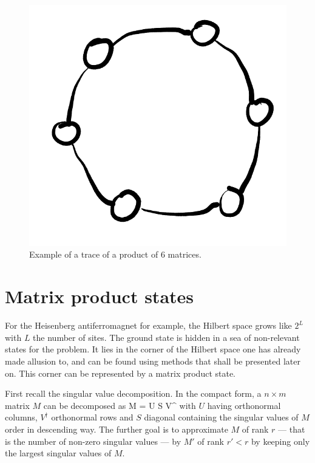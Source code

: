 		\begin{figure}[h!]
            \centering
            \includegraphics[scale=0.2]{graphs/TNtrace.png}
            \caption{Example of a trace of a product of $6$ matrices.}
            \label{fig:TNtrace}
        \end{figure}

    \section{Matrix product states}

    	For the Heisenberg antiferromagnet for example, the Hilbert space grows like $2^L$ with $L$ the number of sites. The ground state is hidden in a sea of non-relevant states for the problem. It lies in the corner of the Hilbert space one has already made allusion to, and can be found using methods that shall be presented later on. This corner can be represented by a matrix product state.

    	First recall the singular value decomposition. In the compact form, a $n\times m$ matrix $M$ can be decomposed as
    	\be M = U S V^\dagger \ee
    	with $U$ having orthonormal columns, $V^\dagger$ orthonormal rows and $S$ diagonal containing the singular values of $M$ order in descending way. The further goal is to approximate $M$ of rank $r$ --- that is the number of non-zero singular values --- by $M'$ of rank $r'<r$ by keeping only the largest singular values of $M$.

